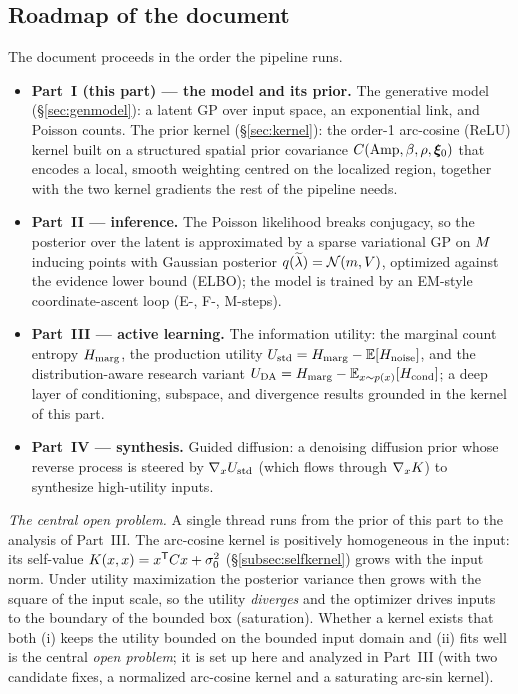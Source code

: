 \subsection{Roadmap of the document}

The document proceeds in the order the pipeline runs.

\begin{itemize}[leftmargin=1.4em]
\item \textbf{Part~I (this part) --- the model and its prior.} The generative model
  (\S\ref{sec:genmodel}): a latent GP over input space, an exponential link, and
  Poisson counts. The prior kernel (\S\ref{sec:kernel}): the order-1
  arc-cosine (ReLU) kernel built on a structured spatial prior covariance
  $C(\mathrm{Amp},\beta,\rho,\bm{\xi}_{0})$ that encodes a local, smooth weighting centred on
  the localized region, together with the two kernel gradients the rest of the
  pipeline needs.
\item \textbf{Part~II --- inference.} The Poisson likelihood breaks conjugacy, so
  the posterior over the latent is approximated by a sparse variational GP on $M$
  inducing points with Gaussian posterior $q(\widetilde{\lambda})=\mathcal{N}(m,V)$, optimized
  against the evidence lower bound (ELBO); the model is trained by an EM-style
  coordinate-ascent loop (E-, F-, M-steps).
\item \textbf{Part~III --- active learning.} The information utility: the marginal
  count entropy $H_{\mathrm{marg}}$, the production utility
  $U_{\mathrm{std}}=H_{\mathrm{marg}}-\mathbb{E}[H_{\mathrm{noise}}]$, and the distribution-aware research variant
  $U_{\mathrm{DA}}=H_{\mathrm{marg}}-\mathbb{E}_{x\sim p(x)}[H_{\mathrm{cond}}]$; a deep layer of conditioning, subspace, and
  divergence results grounded in the kernel of this part.
\item \textbf{Part~IV --- synthesis.} Guided diffusion: a denoising diffusion prior
  whose reverse process is steered by $\nabla_xU_{\mathrm{std}}$ (which flows through
  $\nabla_xK$) to synthesize high-utility inputs.
\end{itemize}

\emph{The central open problem.} A single thread runs from the prior of this part
to the analysis of Part~III. The arc-cosine kernel is positively homogeneous in
the input: its self-value $K(x,x)=x^{\mathsf{T}}C x+\sigma_{0}^2$
(\S\ref{subsec:selfkernel}) grows with the input norm. Under utility maximization
the posterior variance then grows with the square of the input scale, so the
utility \emph{diverges} and the optimizer drives inputs to the boundary of the
bounded box (saturation). Whether a kernel exists that both (i) keeps the utility
bounded on the bounded input domain and (ii) fits well is the central \emph{open
problem}; it is set up here and analyzed in Part~III (with two candidate fixes, a
normalized arc-cosine kernel and a saturating arc-sin kernel).


